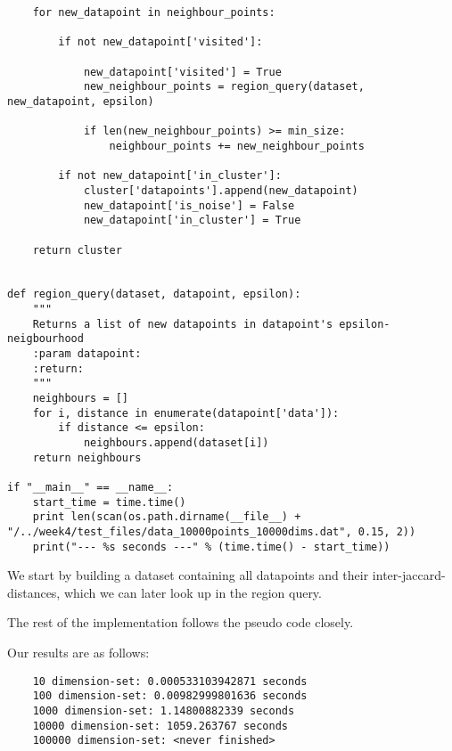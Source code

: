 \documentclass{article}
\begin{document}
\begin{lstlisting}
    for new_datapoint in neighbour_points:

        if not new_datapoint['visited']:

            new_datapoint['visited'] = True
            new_neighbour_points = region_query(dataset, new_datapoint, epsilon)

            if len(new_neighbour_points) >= min_size:
                neighbour_points += new_neighbour_points

        if not new_datapoint['in_cluster']:
            cluster['datapoints'].append(new_datapoint)
            new_datapoint['is_noise'] = False
            new_datapoint['in_cluster'] = True

    return cluster


def region_query(dataset, datapoint, epsilon):
    """
    Returns a list of new datapoints in datapoint's epsilon-neigbourhood
    :param datapoint:
    :return:
    """
    neighbours = []
    for i, distance in enumerate(datapoint['data']):
        if distance <= epsilon:
            neighbours.append(dataset[i])
    return neighbours

if "__main__" == __name__:
    start_time = time.time()
    print len(scan(os.path.dirname(__file__) + "/../week4/test_files/data_10000points_10000dims.dat", 0.15, 2))
    print("--- %s seconds ---" % (time.time() - start_time))
\end{lstlisting}

We start by building a dataset containing all datapoints and their inter-jaccard-distances, which we can later look up in the region query.

The rest of the implementation follows the pseudo code closely.

Our results are as follows:

\begin{verbatim}
	10 dimension-set: 0.000533103942871 seconds
	100 dimension-set: 0.00982999801636 seconds
	1000 dimension-set: 1.14800882339 seconds
	10000 dimension-set: 1059.263767 seconds
	100000 dimension-set: <never finished>
\end{verbatim}
\end{document}
